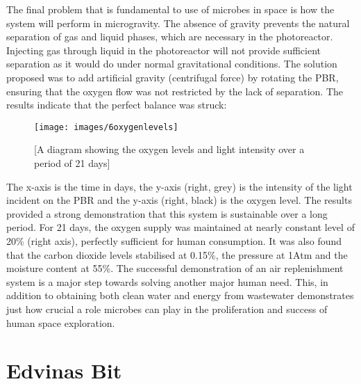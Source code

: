 \documentclass[12pt]{article}
\begin{document}
The final problem that is fundamental to use of microbes in space is how the system will perform in microgravity. The absence of gravity prevents the natural separation of gas and liquid phases, which are necessary in the photoreactor. Injecting gas through liquid in the photoreactor will not provide sufficient separation as it would do under normal gravitational conditions. The solution proposed was to add artificial gravity (centrifugal force) by rotating the PBR, ensuring that the oxygen flow was not restricted by the lack of separation. The results indicate that the perfect balance was struck: 

\begin{figure}[ht]
\centering
\texttt{[image: images/6oxygenlevels]}
\caption {[A diagram showing the oxygen levels and light intensity over a period of 21 days\cite{agency2000exemple}]}
\label{fig:6oxygenlevels}
\end{figure}

The x-axis is the time in days, the y-axis (right, grey) is the intensity of the light incident on the PBR and the y-axis (right, black) is the oxygen level. 
The results provided a strong demonstration that this system is sustainable over a long period. For 21 days, the oxygen supply was maintained at nearly constant level of 20\% (right axis), perfectly sufficient for human consumption. It was also found that the carbon dioxide levels stabilised at 0.15\%, the pressure at 1Atm and the moisture content at 55\%. The successful demonstration of an air replenishment system is a major step towards solving another major human need. This, in addition to obtaining both clean water and energy from wastewater demonstrates just how crucial a role microbes can play in the proliferation and success of human space exploration. 

\section{Edvinas Bit}
\end{document}
